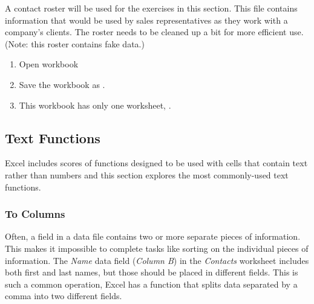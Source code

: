 A contact roster will be used for the exercises in this section. This file contains information that would be used by sales representatives as they work with a company's clients. The roster needs to be cleaned up a bit for more efficient use. (Note: this roster contains fake data.)

\begin{enumerate}
	\item Open workbook 
	\item Save the workbook as .
	\item This workbook has only one worksheet, .
\end{enumerate}

\subsection{Text Functions}

Excel includes scores of functions designed to be used with cells that contain text rather than numbers and this section explores the most commonly-used text functions.

\subsubsection{To Columns}

Often, a field in a data file contains two or more separate pieces of information. This makes it impossible to complete tasks like sorting on the individual pieces of information. The \textit{Name} data field (\textit{Column B}) in the \textit{Contacts} worksheet includes both first and last names, but those should be placed in different fields. This is such a common operation, Excel has a function that splits data separated by a comma into two different fields.

